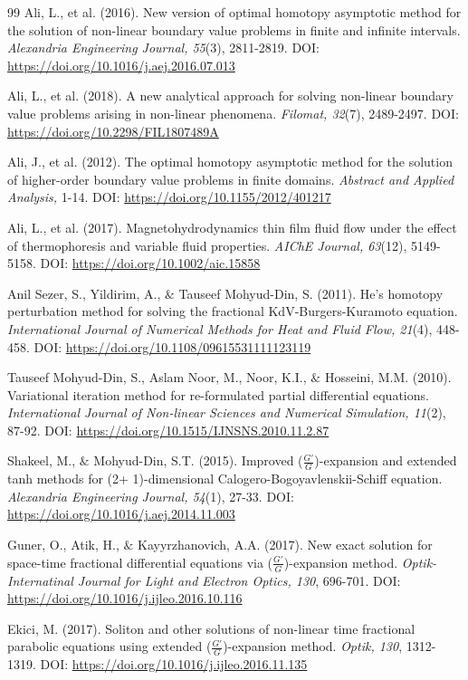 \documentclass[10pt]{NSP1}
\numberwithin{equation}{section}
\begin{document}
\begin{thebibliography}{99}
 Ali, L., et al. (2016). New version of optimal homotopy asymptotic method for the solution of non-linear boundary value problems in finite and infinite intervals. \emph{Alexandria Engineering Journal, 55}(3), 2811-2819. DOI: \url{https://doi.org/10.1016/j.aej.2016.07.013}

 Ali, L., et al. (2018). A new analytical approach for solving non-linear boundary value problems arising in non-linear phenomena. \emph{Filomat, 32}(7), 2489-2497. DOI: \url{https://doi.org/10.2298/FIL1807489A}

 Ali, J., et al. (2012). The optimal homotopy asymptotic method for the solution of higher-order boundary value problems in finite domains. \emph{Abstract and Applied Analysis,} 1-14. DOI: \url{https://doi.org/10.1155/2012/401217}

 Ali, L., et al. (2017). Magnetohydrodynamics thin film fluid flow under the effect of thermophoresis and variable fluid properties. \emph{AIChE Journal, 63}(12), 5149-5158. DOI: \url{https://doi.org/10.1002/aic.15858}

 Anil Sezer, S., Yildirim, A., ${\&}$ Tauseef Mohyud-Din, S. (2011). He's homotopy perturbation method for solving the fractional KdV-Burgers-Kuramoto equation. \emph{International Journal of Numerical Methods for Heat and Fluid Flow, 21}(4), 448-458. DOI: \url{https://doi.org/10.1108/09615531111123119}

 Tauseef Mohyud-Din, S., Aslam Noor, M., Noor, K.I., ${\&}$ Hosseini, M.M. (2010). Variational iteration method for re-formulated partial differential equations. \emph{International Journal of Non-linear Sciences and Numerical Simulation, 11}(2), 87-92. DOI: \url{https://doi.org/10.1515/IJNSNS.2010.11.2.87}

 Shakeel, M., ${\&}$ Mohyud-Din, S.T. (2015). Improved ($\frac{G'}{G}$)-expansion and extended tanh methods for (2+ 1)-dimensional Calogero-Bogoyavlenskii-Schiff equation. \emph{Alexandria Engineering Journal, 54}(1), 27-33. DOI: \url{https://doi.org/10.1016/j.aej.2014.11.003}

 Guner, O., Atik, H., ${\&}$ Kayyrzhanovich, A.A. (2017). New exact solution for space-time fractional differential equations via ($\frac{G'}{G}$)-expansion method. \emph{Optik-Internatinal Journal for Light and Electron Optics, 130}, 696-701. DOI: \url{https://doi.org/10.1016/j.ijleo.2016.10.116}

 Ekici, M. (2017). Soliton and other solutions of non-linear time fractional parabolic equations using extended ($\frac{G'}{G}$)-expansion method. \emph{Optik, 130}, 1312-1319. DOI: \url{https://doi.org/10.1016/j.ijleo.2016.11.135}


\end{thebibliography}
\end{document}
